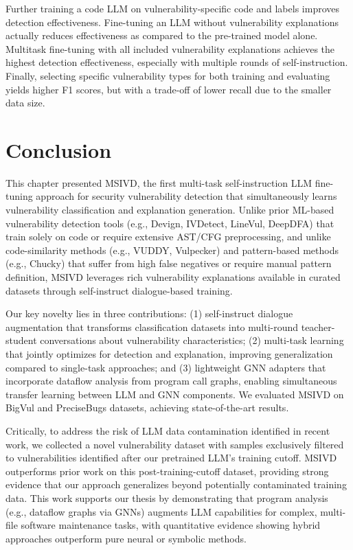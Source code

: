 \documentclass[12pt,openany,oneside,table]{cmuthesis}
\begin{document}
\begin{tcolorbox}
[colback=white,colframe=black,arc=0pt,boxrule=0.5pt,title=RQ3 Summary,boxsep=2pt,left=1pt,right=1pt,top=1pt,bottom=1pt,fonttitle=\bfseries]
Further training a code LLM on vulnerability-specific code and labels improves detection effectiveness. Fine-tuning an LLM without vulnerability explanations actually reduces effectiveness as compared to the pre-trained model alone. Multitask fine-tuning with all included vulnerability explanations achieves the highest detection effectiveness, especially with multiple rounds of self-instruction. Finally, selecting specific vulnerability types for both training and evaluating yields higher F1 scores, but with a trade-off of lower recall due to the smaller data size.
\end{tcolorbox}

\section{Conclusion}
This chapter presented MSIVD, the first multi-task self-instruction LLM fine-tuning approach for security vulnerability detection that simultaneously learns vulnerability classification and explanation generation. Unlike prior ML-based vulnerability detection tools (e.g., Devign, IVDetect, LineVul, DeepDFA) that train solely on code or require extensive AST/CFG preprocessing, and unlike code-similarity methods (e.g., VUDDY, Vulpecker) and pattern-based methods (e.g., Chucky) that suffer from high false negatives or require manual pattern definition, MSIVD leverages rich vulnerability explanations available in curated datasets through self-instruct dialogue-based training.

Our key novelty lies in three contributions: (1) self-instruct dialogue augmentation that transforms classification datasets into multi-round teacher-student conversations about vulnerability characteristics; (2) multi-task learning that jointly optimizes for detection and explanation, improving generalization compared to single-task approaches; and (3) lightweight GNN adapters that incorporate dataflow analysis from program call graphs, enabling simultaneous transfer learning between LLM and GNN components. We evaluated MSIVD on BigVul and PreciseBugs datasets, achieving state-of-the-art results.

Critically, to address the risk of LLM data contamination identified in recent work, we collected a novel vulnerability dataset with samples exclusively filtered to vulnerabilities identified after our pretrained LLM's training cutoff. MSIVD outperforms prior work on this post-training-cutoff dataset, providing strong evidence that our approach generalizes beyond potentially contaminated training data. This work supports our thesis by demonstrating that program analysis (e.g., dataflow graphs via GNNs) augments LLM capabilities for complex, multi-file software maintenance tasks, with quantitative evidence showing hybrid approaches outperform pure neural or symbolic methods. 
\end{document}
